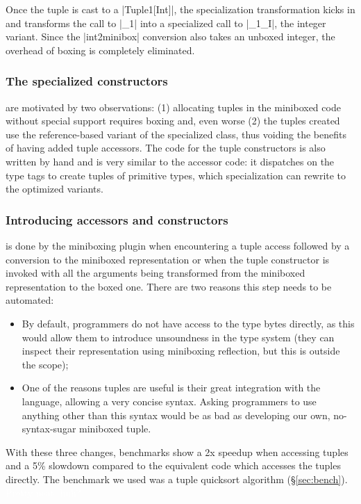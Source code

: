 Once the tuple is cast to a |Tuple1[Int]|, the specialization transformation kicks in and transforms the call to |_1| into a specialized call to |_1_I|, the integer variant. Since the |int2minibox| conversion also takes an unboxed integer, the overhead of boxing is completely eliminated.


\subsubsection{The specialized constructors} are motivated by two observations: (1) allocating tuples in the miniboxed code without special support requires boxing and, even worse (2) the tuples created use the reference-based variant of the specialized class, thus voiding the benefits of having added tuple accessors. The code for the tuple constructors is also written by hand and is very similar to the accessor code: it dispatches on the type tags to create tuples of primitive types, which specialization can rewrite to the optimized variants. 


\subsubsection{Introducing accessors and constructors} is done by the miniboxing plugin when encountering a tuple access followed by a conversion to the miniboxed representation or when the tuple constructor is invoked with all the arguments being transformed from the miniboxed representation to the boxed one. There are two reasons this step needs to be automated:

\begin{itemize}
 \item By default, programmers do not have access to the type bytes directly, as this would allow them to introduce unsoundness in the type system (they can inspect their representation using miniboxing reflection, but this is outside the scope);
 \item One of the reasons tuples are useful is their great integration with the language, allowing a very concise syntax. Asking programmers to use anything other than this syntax would be as bad as developing our own, no-syntax-sugar miniboxed tuple.
\end{itemize}

With these three changes, benchmarks show a 2x speedup when accessing tuples and a 5\% slowdown compared to the equivalent code which accesses the tuples directly. The benchmark we used was a tuple quicksort algorithm (\S\ref{sec:bench}). \textcolor{white}{Pretty neat, huh?}

